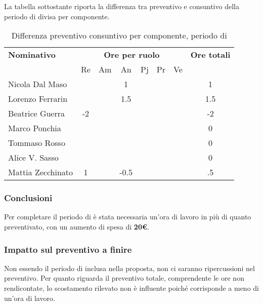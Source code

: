La tabella sottostante riporta la differenza tra preventivo e consuntivo della periodo di \AR{} divisa per componente.
\begin{table}[H]
	\centering
	\begin{tabular}{|l|c|c|c|c|c|c|c|}
		\hline
		\textbf{Nominativo} & 
		\multicolumn{6}{c|}{\textbf{Ore per ruolo}} & 
		\textbf{Ore totali} \\
		& Re & Am & An & Pj & Pr & Ve & \\
		\hline
		Nicola Dal Maso & & &1 & & & & 1 \\
		Lorenzo Ferrarin & & &1.5 & & & & 1.5 \\
		Beatrice Guerra & -2 & & & & & & -2 \\
		Marco Ponchia & & & & & & & 0 \\
		Tommaso Rosso & & & & & & & 0 \\
		Alice V. Sasso & & & & & & & 0 \\
		Mattia Zecchinato & 1& &-0.5 & & & & .5  \\
		\hline
	\end{tabular}
	\caption{Differenza preventivo consuntivo per componente, periodo di \AR}
\end{table}
\subsubsection{Conclusioni}
Per completare il periodo di \AR{} è stata necessaria un'ora di lavoro in più di quanto preventivato, con un aumento di spesa di \textbf{20€}.
\subsubsection{Impatto sul preventivo a finire}
Non essendo il periodo di \AR{} inclusa nella proposta, non ci saranno ripercussioni nel preventivo. Per quanto riguarda il preventivo totale, comprendente le ore non rendicontate, lo scostamento rilevato non è influente poiché corrisponde a meno di un'ora di lavoro.

